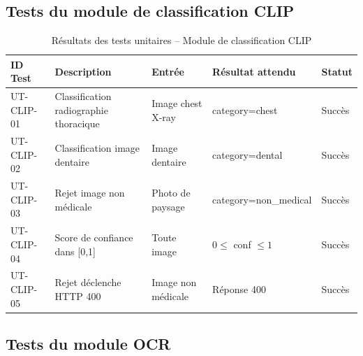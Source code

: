 \subsection{Tests du module de classification CLIP}

\begin{table}[H]
\centering
\caption{Résultats des tests unitaires -- Module de classification CLIP}
\label{tab:tests_clip}
\begin{tabularx}{\textwidth}{p{2.2cm} X p{3cm} p{1.5cm} p{1.2cm}}
\toprule
\textbf{ID Test} & \textbf{Description} & \textbf{Entrée} & \textbf{Résultat attendu} & \textbf{Statut} \\
\midrule
UT-CLIP-01 & Classification radiographie thoracique & Image chest X-ray & category=chest & \textcolor{green!60!black}{Succès} \\
UT-CLIP-02 & Classification image dentaire          & Image dentaire    & category=dental & \textcolor{green!60!black}{Succès} \\
UT-CLIP-03 & Rejet image non médicale               & Photo de paysage  & category=non\_medical & \textcolor{green!60!black}{Succès} \\
UT-CLIP-04 & Score de confiance dans [0,1]          & Toute image       & $0 \le$ conf $\le 1$ & \textcolor{green!60!black}{Succès} \\
UT-CLIP-05 & Rejet déclenche HTTP 400               & Image non médicale & Réponse 400 & \textcolor{green!60!black}{Succès} \\
\bottomrule
\end{tabularx}
\end{table}

\subsection{Tests du module OCR}

